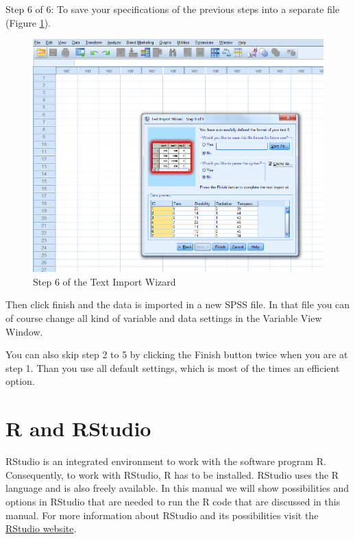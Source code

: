 \documentclass[
]{book}
\begin{document}
Step 6 of 6:
To save your specifications of the previous steps into a separate file (Figure \ref{fig:fig24}).

\begin{figure}

{\centering \includegraphics[width=0.95\linewidth]{images/fig1.24} 

}

\caption{Step 6 of the Text Import Wizard}\label{fig:fig24}
\end{figure}

Then click finish and the data is imported in a new SPSS file. In that file you can of course change all kind of variable and data settings in the Variable View Window.

You can also skip step 2 to 5 by clicking the Finish button twice when you are at step 1. Than you use all default settings, which is most of the times an efficient option.

\hypertarget{r-and-rstudio}{%
\section{R and RStudio}\label{r-and-rstudio}}

RStudio is an integrated environment to work with the software program R. Consequently, to work with RStudio, R has to be installed. RStudio uses the R language and is also freely available. In this manual we will show possibilities and options in RStudio that are needed to run the R code that are discussed in this manual. For more information about RStudio and its possibilities visit the \href{https://www.rstudio.com/}{RStudio website}.
\end{document}
